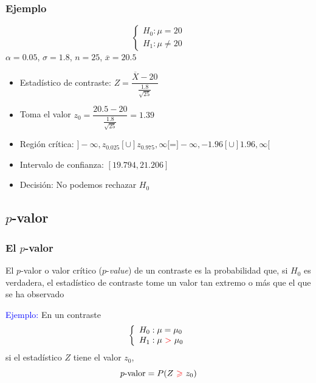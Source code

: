 \documentclass[12pt,t]{beamer}\usepackage[]{graphicx}\usepackage[]{color}
\newcommand{\red}[1]{\textcolor{red}{#1}}
\newcommand{\blue}[1]{\textcolor{blue}{#1}}
\renewcommand{\emph}[1]{{\color{red}#1}}
\renewcommand{\geq}{\geqslant}
\theoremstyle{plain}
\theoremstyle{definition}
\begin{document}
\begin{frame}
\frametitle{Ejemplo}
\vspace*{-4ex}

$$
\left\{\begin{array}{l}
H_{0}:\mu=20\\ H_{1}:\mu\neq 20
\end{array}
\right.
$$
$\alpha=0.05$, $\sigma=1.8$, $n=25$, $\overline{x}=20.5$
\medskip

\begin{itemize}
\item \emph{Estadístico de contraste}: $Z=
\dfrac{\overline{X}-20}{\frac{1.8}{\sqrt{25}}}$
\medskip

\item Toma el valor $z_0=\dfrac{20.5-20}{\frac{1.8}{\sqrt{25}}}=1.39$
\medskip

\item \emph{Región crítica}: $]-\infty,z_{0.025}[\cup ]z_{0.975},\infty[$=$]-\infty,-1.96[\cup ]1.96,\infty[$
\medskip

\item \emph{Intervalo de confianza}: $[19.794,21.206]$
\medskip

\item \emph{Decisión}:
No podemos  rechazar   $H_0$
\end{itemize}

\end{frame}




\subsection{$p$-valor}

\begin{frame}
\frametitle{El $p$-valor}

El  \emph{$p$-valor} o  \emph{valor crítico}  ($p$-\textsl{value}) de un contraste es la probabilidad que, si $H_0$ es verdadera, el estadístico de contraste tome un valor tan extremo o  más que el que se ha observado
\medskip

\blue{Ejemplo:} En un contraste
$$
\left\{\begin{array}{l}
H_{0}:\mu=\mu_{0}\\ H_{1}:\mu\ \red{>}\ \mu_{0}
\end{array}
\right.
$$
si el estadístico $Z$ tiene el  valor $z_0$,
$$
\mbox{$p$-valor}=P(Z\ \red{\geq}\ z_0)
$$ 
\end{frame}
\end{document}
